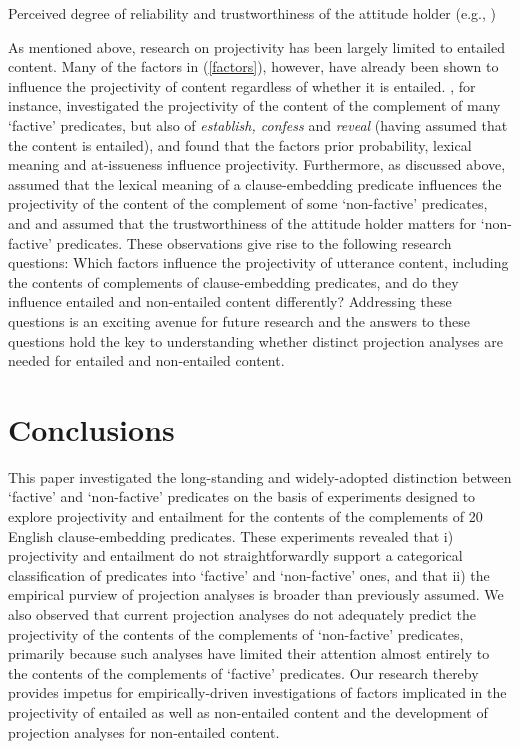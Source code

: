 \documentclass[11pt,fleqn]{article}
\newcommand{\6}{\mbox{$[\hspace*{-.6mm}[$}}
\newcommand{\9}{\mbox{$]\hspace*{-.6mm}]$}}
\begin{document}
{\begin{exe}
\begin{xlist}
\ex Perceived degree of reliability and trustworthiness of the attitude holder (e.g., \citealt{schlenker10,demarneffe-etal2012})

\end{xlist}
\end{exe}

As mentioned above, research on projectivity has been largely limited to entailed content. Many of the factors in (\ref{factors}), however, have already been shown to influence the projectivity of content regardless of whether it is entailed. \citet{tbd-variability}, for instance, investigated the projectivity of the content of the complement of many `factive' predicates, but also of {\em establish, confess} and {\em reveal} (having assumed that the content is entailed), and found that the factors prior probability, lexical meaning and at-issueness influence projectivity. Furthermore, as discussed above, \citet{anand-hacquard2014} assumed that the lexical meaning of a clause-embedding predicate influences the projectivity of the content of the complement of some `non-factive' predicates, and \citealt{schlenker10} and \citealt{demarneffe-etal2012} assumed that the trustworthiness of the attitude holder matters for `non-factive' predicates. These observations give rise to the following research questions: Which factors influence the projectivity of utterance content, including the contents of complements of clause-embedding predicates, and do they influence entailed and non-entailed content differently? Addressing these questions is an exciting avenue for future research and the answers to these questions hold the key to understanding whether distinct projection analyses are needed for entailed and non-entailed content.

\section{Conclusions}\label{s5}

This paper investigated the long-standing and widely-adopted distinction between `factive' and `non-factive' predicates on the basis of experiments designed to explore projectivity and entailment for the contents of the complements of 20 English clause-embedding predicates. These experiments revealed that i) projectivity and entailment do not straightforwardly support a categorical classification of predicates into `factive' and `non-factive' ones, and that ii) the empirical purview of projection analyses is broader than previously assumed. We also observed that current projection analyses do not adequately predict the projectivity of the contents of the complements of `non-factive' predicates, primarily because such analyses have limited their attention almost entirely to the contents of the complements of `factive' predicates. Our research thereby provides impetus for empirically-driven investigations of factors implicated in the projectivity of entailed as well as non-entailed content and the development of projection analyses for non-entailed content.


}
\end{document}
